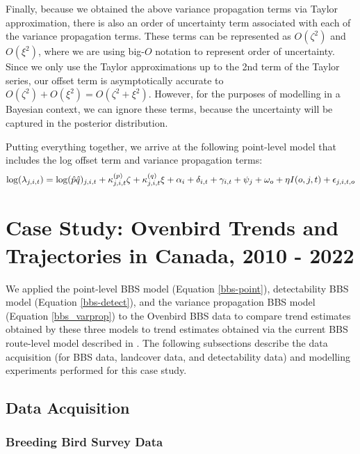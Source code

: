 \documentclass[12pt]{article}
\begin{document}
\par Finally, because we obtained the above variance propagation terms via Taylor approximation, there is also an order of uncertainty term associated with each of the variance propagation terms.
These terms can be represented as $O(\zeta^2)$ and $O(\xi^2)$, where we are using big-$O$ notation to represent order of uncertainty. 
Since we only use the Taylor approximations up to the 2nd term of the Taylor series, our offset term is asymptotically accurate to $O(\zeta^2) + O(\xi^2) = O(\zeta^2 + \xi^2)$.
However, for the purposes of modelling in a Bayesian context, we can ignore these terms, because the uncertainty will be captured in the posterior distribution.

Putting everything together, we arrive at the following point-level model that includes the log offset term and variance propagation terms:
\begin{equation}\label{bbs_varprop}
	\log(\lambda_{j,i,t}) = \log(\hat{p} \hat{q})_{j,i,t} + \kappa_{j,i,t}^{(p)}\zeta + \kappa_{j,i,t}^{(q)}\xi + \alpha_i + \delta_{i,t} + \gamma_{i,t} + \psi_j + \omega_o + \eta I(o,j,t) + \epsilon_{j,i,t,o} \\
\end{equation}

\section{Case Study: Ovenbird Trends and Trajectories in Canada, 2010 - 2022}

\par We applied the point-level BBS model (Equation \ref{bbs-point}), detectability BBS model (Equation \ref{bbs-detect}), and the variance propagation BBS model (Equation \ref{bbs_varprop}) to the Ovenbird BBS data to compare trend estimates obtained by these three models to trend estimates obtained via the current BBS route-level model described in \citet{smith_spatially_2023}.
The following subsections describe the data acquisition (for BBS data, landcover data, and detectability data) and modelling experiments performed for this case study.

\subsection{Data Acquisition}

\subsubsection{Breeding Bird Survey Data}
\end{document}
